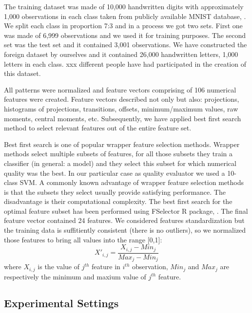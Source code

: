 \documentclass{llncs}
\begin{document}
The training dataset was made of 10,000 handwritten digits with approximately 1,000 observations in each class taken from publicly available MNIST database, \cite{LeCunCortesBurges}. We split each class in proportion 7:3 and in a process we got two sets. First one was made of 6,999 observations and we used it for training purposes. The second set was the test set and it contained 3,001 observations. 
We have constructed the foreign dataset by ourselves and it contained 26,000 handwritten letters, 1,000 letters in each class. xxx different people have had participated in the creation of this dataset.

All patterns were normalized and feature vectors comprising of 106 numerical features were created. Feature vectors described not only but also: projections, histograms of projections, transitions, offsets, minimum/maximum values, raw moments, central moments, etc. Subsequently, we have applied best first search method to select relevant features out of the entire feature set. 

Best first search is one of popular wrapper feature selection methods. Wrapper methods select multiple subsets of features, for all those subsets they train a classifier (in general: a model) and they select this subset for which numerical quality was the best. In our particular case as quality evaluator we used a 10-class SVM. A commonly known advantage of wrapper feature selection methods is that the subsets they select usually provide satisfying performance. The disadvantage is their computational complexity. The best first search for the optimal feature subset has been performed using FSelector R package, \cite{Romanski}. The final feature vector contained 24 features. We considered features standardization but the training data is suffitiently consistent (there is no outliers), so we normalized those features to bring all values into the range [0,1]:
\begin{equation}\label{eqn:normalization}
    X'_{i,j} = \frac{X_{i,j} - Min_{j}}{Max_{j}-Min_{j}}
\end{equation}
where $X_{i,j}$ is the value of $j^{th}$ feature in $i^{th}$ observation, $Min_{j}$ and $Max_{j}$ are respectively the minimum and maxium value of $j^{th}$ feature.


\subsection{Experimental Settings}
\end{document}
